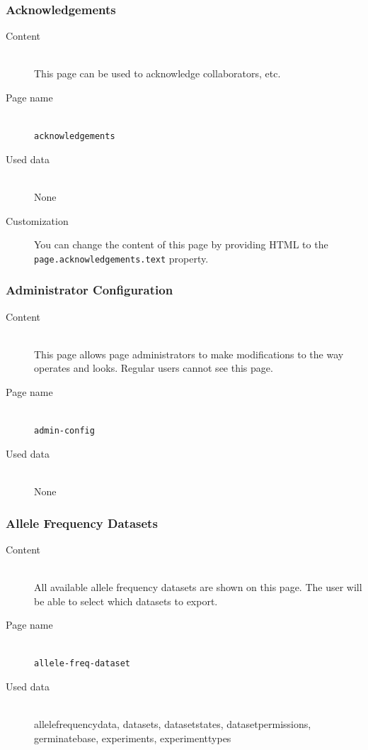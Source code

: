 \subsubsection{Acknowledgements}
\begin{description}
	\item[Content]\hfill\\This page can be used to acknowledge collaborators, etc.
	\item[Page name]\hfill\\\texttt{acknowledgements}
	\item[Used data]\hfill\\None
	\item[Customization] You can change the content of this page by providing HTML to the \texttt{page.\allowbreak acknowledgements.\allowbreak text} property.
\end{description}

\subsubsection{Administrator Configuration}
\begin{description}
	\item[Content]\hfill\\This page allows page administrators to make modifications to the way {\germinate} operates and looks. Regular users cannot see this page.
	\item[Page name]\hfill\\\texttt{admin-config}
	\item[Used data]\hfill\\None
\end{description}

\subsubsection{Allele Frequency Datasets}
\begin{description}
	\item[Content]\hfill\\All available allele frequency datasets are shown on this page. The user will be able to select which datasets to export.
	\item[Page name]\hfill\\\texttt{allele-freq-dataset}
	\item[Used data]\hfill\\allelefrequencydata, datasets, datasetstates, datasetpermissions, germinatebase, experiments, experimenttypes
\end{description}

